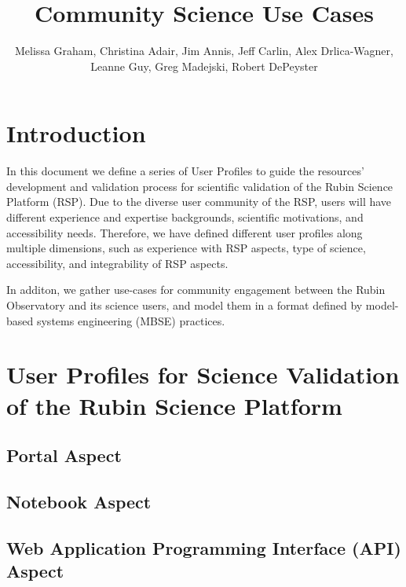 \documentclass[DM,lsstdraft,authoryear,toc]{lsstdoc}
\title{Community Science Use Cases}
\author{%
Melissa Graham, Christina Adair, Jim Annis, Jeff Carlin, Alex Drlica-Wagner, Leanne Guy, Greg Madejski, Robert DePeyster
}
\date{\vcsDate}
\begin{document}
\maketitle


\section{Introduction}

In this document we define a series of User Profiles to guide the resources' development and validation process for scientific validation of the Rubin Science Platform (RSP).  Due to the diverse user community of the RSP, users will have different experience and expertise backgrounds, scientific motivations, and accessibility needs. Therefore, we have defined different user profiles along multiple dimensions, such as experience with RSP aspects, type of science, accessibility, and integrability of RSP aspects.

In additon, we gather use-cases for community engagement between the Rubin Observatory and its science users, and model them in a format defined by model-based systems engineering (MBSE) practices.

\clearpage
\section{User Profiles for Science Validation of the Rubin Science Platform}

\clearpage
\subsection{Portal Aspect}


\clearpage
\subsection{Notebook Aspect}


\clearpage
\subsection{Web Application Programming Interface (API) Aspect}

\end{document}
